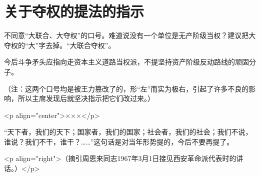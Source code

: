 \section[关于夺权的提法的指示（一九六七年二月二十七日）]{关于夺权的提法的指示}


不同意“大联合、大夺权”的口号。难道说没有一个单位是无产阶级当权？建议把大夺权的“大”字去掉。“大联合夺权”。

今后斗争矛头应指向走资本主义道路当权派，不提坚持资产阶级反动路线的顽固分子。

（注：这两个口号均是被王力篡改了的，形“左”而实为极右，引起了许多不良的影响，所以主席发现后就坚决指示把它们改过来。）

<p align="center">×××</p>

“天下者，我们的天下；国家者，我们的国家；社会者，我们的社会；我们不说，谁说？我们不干，谁干？……”这句话是对当年形势提的，今后不要再提了。

<p align="right">（摘引周恩来同志1967年3月1日接见西安革命派代表时的讲话。）</p>


